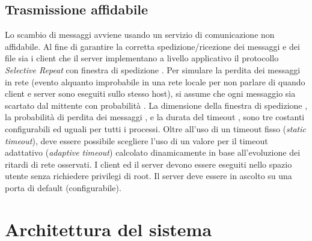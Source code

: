 \subsection{Trasmissione affidabile }
Lo scambio di messaggi avviene usando un servizio di comunicazione non affidabile.
Al fine di garantire la corretta spedizione/ricezione dei messaggi e dei file sia i client che il server implementano a livello applicativo il protocollo \textit{Selective Repeat} con finestra di spedizione .
Per simulare la perdita dei messaggi in rete (evento alquanto improbabile in una rete locale per non parlare di quando client e server sono eseguiti sullo stesso host), si assume che ogni messaggio sia scartato dal mittente con probabilità .
La dimensione della finestra di spedizione , la probabilità di perdita dei messaggi , e la durata del timeout , sono tre costanti configurabili ed uguali per tutti i processi.
Oltre all'uso di un timeout fisso (\textit{static timeout}), deve essere possibile scegliere l'uso di un valore per il timeout adattativo (\textit{adaptive timeout}) calcolato dinamicamente in base all'evoluzione dei ritardi di rete osservati.
I client ed il server devono essere eseguiti nello spazio utente senza richiedere privilegi di root.
Il server deve essere in ascolto su una porta di default (configurabile).

\section{Architettura del sistema }

